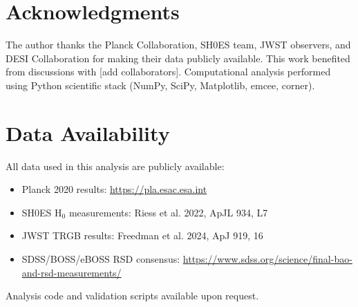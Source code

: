 \documentclass[11pt,letterpaper]{article}
\begin{document}
\section*{Acknowledgments}

The author thanks the Planck Collaboration, SH0ES team, JWST observers, and DESI Collaboration for making their data publicly available. This work benefited from discussions with [add collaborators]. Computational analysis performed using Python scientific stack (NumPy, SciPy, Matplotlib, emcee, corner).

\section*{Data Availability}

All data used in this analysis are publicly available:
\begin{itemize}
\item Planck 2020 results: \url{https://pla.esac.esa.int}
\item SH0ES H$_0$ measurements: Riess et al. 2022, ApJL 934, L7
\item JWST TRGB results: Freedman et al. 2024, ApJ 919, 16
\item SDSS/BOSS/eBOSS RSD consensus: \url{https://www.sdss.org/science/final-bao-and-rsd-measurements/}
\end{itemize}

\noindent Analysis code and validation scripts available upon request.
\end{document}
